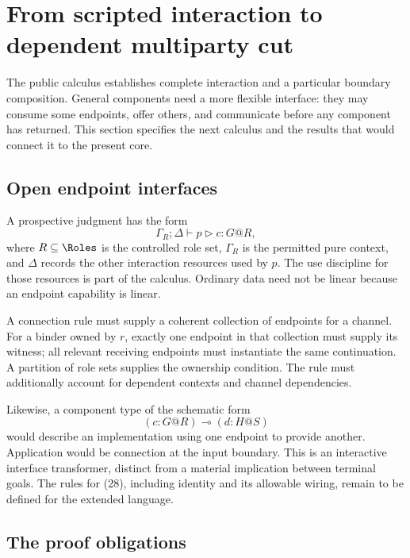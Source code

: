 \section{From scripted interaction to dependent multiparty cut}
\label{sec:development}

The public calculus establishes complete interaction and a particular
boundary composition. General components need a more flexible interface:
they may consume some endpoints, offer others, and communicate before any
component has returned. This section specifies the next calculus and the
results that would connect it to the present core.

\subsection{Open endpoint interfaces}

A prospective judgment has the form
\[
 \Gamma_R;\Delta\vdash p\mathrel{\triangleright}c:G@R,
 \tag{27}
\]
where $R\subseteq\Roles$ is the controlled role set, $\Gamma_R$ is the
permitted pure context, and $\Delta$ records the other interaction resources
used by $p$. The use discipline for those resources is part of the calculus.
Ordinary data need not be linear because an endpoint capability is linear.

A connection rule must supply a coherent collection of endpoints for a
channel. For a binder owned by $r$, exactly one endpoint in that collection
must supply its witness; all relevant receiving endpoints must instantiate
the same continuation. A partition of role sets supplies the ownership
condition. The rule must additionally account for dependent contexts and
channel dependencies.

Likewise, a component type of the schematic form
\[
 (c:G@R)\multimap(d:H@S)
 \tag{28}
\]
would describe an implementation using one endpoint to provide another.
Application would be connection at the input boundary. This is an interactive
interface transformer, distinct from a material implication between terminal
goals. The rules for (28), including identity and its allowable wiring, remain
to be defined for the extended language.

\subsection{The proof obligations}

